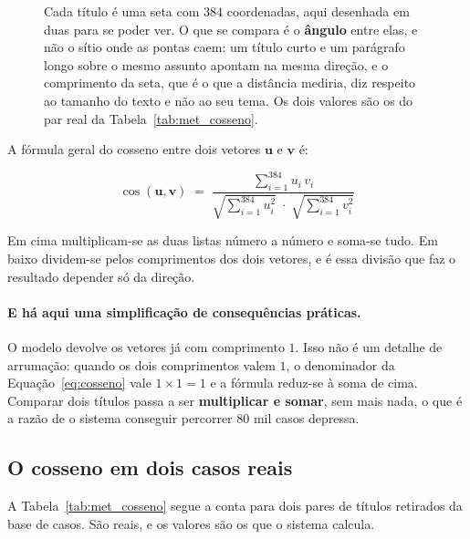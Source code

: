 \begin{figure}[ht]
\caption[O cosseno, e porque é o ângulo e não a distância]{Cada título é uma seta com $384$
coordenadas, aqui desenhada em duas para se poder ver. O que se compara é o \textbf{ângulo} entre
elas, e não o sítio onde as pontas caem: um título curto e um parágrafo longo sobre o mesmo
assunto apontam na mesma direção, e o comprimento da seta, que é o que a distância mediria, diz
respeito ao tamanho do texto e não ao seu tema. Os dois valores são os do par real da
Tabela~\ref{tab:met_cosseno}.}
\label{fig:met_cosseno}
\end{figure}


A fórmula geral do cosseno entre dois vetores $\mathbf{u}$ e $\mathbf{v}$ é:

\begin{equation}
  \cos(\mathbf{u}, \mathbf{v}) \;=\;
  \frac{\displaystyle\sum_{i=1}^{384} u_i \, v_i}
       {\sqrt{\displaystyle\sum_{i=1}^{384} u_i^2} \; \cdot \;
        \sqrt{\displaystyle\sum_{i=1}^{384} v_i^2}}
  \label{eq:cosseno}
\end{equation}

Em cima multiplicam-se as duas listas número a número e soma-se tudo. Em baixo dividem-se pelos
comprimentos dos dois vetores, e é essa divisão que faz o resultado depender só da direção.

\paragraph{E há aqui uma simplificação de consequências práticas.}
O modelo devolve os vetores já com comprimento $1$. Isso não é um detalhe de arrumação: quando os
dois comprimentos valem $1$, o denominador da Equação~\ref{eq:cosseno} vale $1 \times 1 = 1$ e a
fórmula reduz-se à soma de cima. Comparar dois títulos passa a ser \textbf{multiplicar e somar},
sem mais nada, o que é a razão de o sistema conseguir percorrer $80$ mil casos depressa.

\subsection{O cosseno em dois casos reais}

A Tabela~\ref{tab:met_cosseno} segue a conta para dois pares de títulos retirados da base de
casos. São reais, e os valores são os que o sistema calcula.

